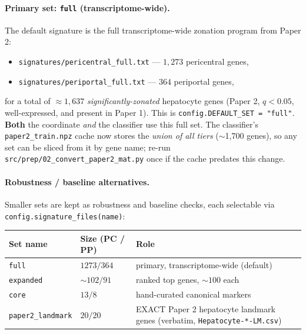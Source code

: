 \documentclass[11pt]{article}
\newcommand{\code}[1]{\texttt{\small #1}}
\begin{document}
\paragraph{Primary set: \code{full} (transcriptome-wide).}
The default signature is the full transcriptome-wide zonation program from Paper 2:
\begin{itemize}[leftmargin=1.4em]
  \item \code{signatures/pericentral\_full.txt} --- $1{,}273$ pericentral genes,
  \item \code{signatures/periportal\_full.txt} --- $364$ periportal genes,
\end{itemize}
for a total of $\approx 1{,}637$ \emph{significantly-zonated} hepatocyte genes (Paper 2,
$q < 0.05$, well-expressed, and present in Paper 1). This is \code{config.DEFAULT\_SET = "full"}.
\textbf{Both} the coordinate \emph{and} the classifier use this full set. The classifier's
\code{paper2\_train.npz} cache now stores the \emph{union of all tiers} ($\sim$1{,}700 genes), so any
set can be sliced from it by gene name; re-run \code{src/prep/02\_convert\_paper2\_mat.py} once if the
cache predates this change.

\paragraph{Robustness / baseline alternatives.}
Smaller sets are kept as robustness and baseline checks, each selectable via
\code{config.signature\_files(name)}:
\begin{center}
\begin{tabular}{@{}l l l@{}}
\toprule
\textbf{Set name} & \textbf{Size (PC / PP)} & \textbf{Role} \\
\midrule
\code{full}            & $1273 / 364$ & primary, transcriptome-wide (default) \\
\code{expanded}        & $\sim 102 / 91$ & ranked top genes, $\sim\!100$ each \\
\code{core}            & $13 / 8$ & hand-curated canonical markers \\
\code{paper2\_landmark} & $20 / 20$ & EXACT Paper 2 hepatocyte landmark genes (verbatim, \code{Hepatocyte-*-LM.csv}) \\
\bottomrule
\end{tabular}
\end{center}
\end{document}
